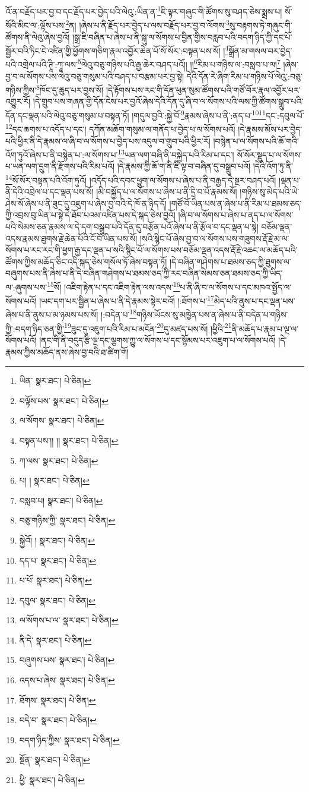 འོ་ན་བརྗོད་པར་བྱ་བ་དང་རྗོད་པར་བྱེད་པའི་ལེའུ་:ཡིན་ན་\footnote{ཡིན་  སྣར་ཐང་།  པེ་ཅིན། }ཇི་ལྟར་གཞུང་གི་ཚོགས་སུ་བཤད་ཅེས་སྨྲས་པ། སོ་སོའི་མིང་ལ་:ལྟོས་པས་\footnote{བལྟོས་པས་  སྣར་ཐང་།  པེ་ཅིན། }ན། །ཞེས་པ་ནི་རྗོད་པར་བྱེད་པ་ལས་བརྗོད་པར་བྱ་བ་ལོགས་\footnote{ལ་སོགས་  སྣར་ཐང་།  པེ་ཅིན། }སུ་བརྟགས་ཏེ་གཞུང་གི་ཚོགས་ནི་ལེའུ་ཞེས་བྱའོ། །སྒྲ་ཇི་བཞིན་པ་ཞེས་པ་ནི་སྐུ་ལ་སོགས་པ་བྱིན་གྱིས་བརླབ་པའི་བདག་ཉིད་ཀྱི་དང་པོ་སྦྱོར་བའི་ཏིང་ངེ་འཛིན་གྱི་ཕྱོགས་གཅིག་རྣལ་འབྱོར་ཆེན་པོ་སོ་སོར་:བསྟན་པས་སོ། །\footnote{བསྟན་པས་།། །།  སྣར་ཐང་།  པེ་ཅིན། }སྒྲོན་མ་གསལ་བར་བྱེད་པའི་འགྲེལ་པའི་ཊཱི་:ཀཱ་ལས་\footnote{ཀ་ལས་  སྣར་ཐང་།  པེ་ཅིན། }ལེའུ་བཅུ་གཉིས་པའི་རྒྱ་ཆེར་བཤད་པའོ།། །།\footnote{པ། །  སྣར་ཐང་།  པེ་ཅིན། }རིམ་པ་གཉིས་ལ་:བསླབ་པ་ལ།\footnote{བསླབ་པ།  སྣར་ཐང་།  པེ་ཅིན། } །ཞེས་བྱ་བ་ལ་སོགས་པས་ལེའུ་བཅུ་གསུམ་པའི་བཤད་པ་བརྩམ་པར་བྱ་སྟེ། དེའི་དོན་རེ་ཞིག་རིམ་པ་གཉིས་པོ་ལེའུ་:བཅུ་གཉིས་ཀྱིས་\footnote{བཅུ་གཉིས་ཀྱི་  སྣར་ཐང་།  པེ་ཅིན། }ཁོང་དུ་ཆུད་པར་བྱས་སོ། །དེ་རྟོགས་པས་རང་གི་དོན་ཕུན་སུམ་ཚོགས་པའི་གཙོ་བོར་རྣལ་འབྱོར་པར་འགྱུར་རོ། །དེ་གྲུབ་པས་གཞན་གྱི་དོན་ངེས་པར་བྱའོ་ཞེས་དེའི་དོན་དུ་ཞི་བ་ལ་སོགས་པའི་ལས་ཀྱི་ཚོགས་སྒྲུབ་པའི་དོན་དང་ལྡན་པའི་ལེའུ་བཅུ་གསུམ་པ་བསྟན་ཏོ། །གདུལ་བྱའི་:སྐྱེ་བོ་\footnote{སྐྱེའོ། །  སྣར་ཐང་།  པེ་ཅིན། }རྣམས་ཞེས་པ་ནི་:ནད་པ་\footnote{དད་པ་  སྣར་ཐང་།  པེ་ཅིན། }\footnote{པ་པོ་  སྣར་ཐང་།  པེ་ཅིན། }དང་:དབུལ་པོ་\footnote{དབུལ་  སྣར་ཐང་།  པེ་ཅིན། }དང་ཆགས་པ་འདོད་པ་དང་། དཀོན་མཆོག་གསུམ་ལ་གནོད་པ་བྱེད་པ་ལ་སོགས་པའོ། །དེ་རྣམས་མོས་པར་བྱེད་པའི་ཕྱིར་ནི་དེ་རྣམས་ལ་ཞི་བ་ལ་སོགས་པ་བྱེད་པས་འདུལ་བ་གྲུབ་པའི་ཕྱིར་རོ། །བསྙེན་པ་ལ་སོགས་པའི་ཆོ་གའི་འོག་ཏུའོ་ཞེས་པ་ནི་བསྙེན་པ་:ལ་སོགས་པ་\footnote{ལ་སོགས་པ་ལ་  སྣར་ཐང་།  པེ་ཅིན། }ཡན་ལག་བཞི་ནི་བསྐྱེད་པའི་རིམ་པ་དང་། སོ་སོར་སྡུད་པ་ལ་སོགས་པ་ཡན་ལག་དྲུག་ནི་རྫོགས་པའི་རིམ་པའོ། །དེ་རྣམས་ཀྱི་ཆོ་ག་ནི་ཇི་ལྟ་བ་བཞིན་དུ་བསྒྲུབ་པའོ། །དེའི་འོག་ཏུ་ནི་\footnote{ནི་དེ་  སྣར་ཐང་།  པེ་ཅིན། }སོ་སོར་བསྟན་པའི་འོག་ཏུའོ། །འདོད་པའི་དབང་ཕྱུག་ལ་སོགས་པ་ཞེས་པ་ནི་བརྒྱད་དེ་སྔར་བཤད་པའོ། །ལྡན་པ་ནི་དེའི་འབྲེལ་པ་དང་ལྡན་པས་སོ། །མི་བསྐྱོད་པ་ལ་སོགས་པ་ཞེས་པ་ནི་དྲི་བ་པོ་རྣམས་སོ། །གཉིས་སུ་མེད་པའི་ཡེ་ཤེས་སོ་ཞེས་པ་ནི་ཟུང་དུ་འཇུག་པ་ཞེས་བྱ་བའི་དེ་ཁོ་ན་ཉིད་དོ། །གཙོ་བོ་ཡིན་པས་ན་ཞེས་པ་ནི་རིམ་པ་ཐམས་ཅད་ཀྱི་འབྲས་བུ་ཡིན་པ་སྟེ་དེ་ཐོབ་པའམ་འཛིན་པས་དེ་སྐད་ཅེས་བྱའོ། །ཞི་བ་ལ་སོགས་པ་ཞེས་པ་ནད་པ་ལ་སོགས་པའི་སེམས་ཅན་རྣམས་ལ་དེ་དག་བསྒྲུབ་པའི་དོན་དུ་བརྩོན་པའོ་ཞེས་པ་ནི་རྩོལ་བ་དང་ལྡན་པ་སྟེ། བཅོམ་ལྡན་འདས་རྣམས་ཐུགས་རྗེ་ཆེན་པོའི་ངོ་བོ་ཡིན་པས་སོ། །སའི་སྙིང་པོ་ཞེས་བྱ་བ་ལ་སོགས་པས་གཟུགས་རྡོ་རྗེ་མ་ལ་སོགས་པ་རང་རང་གི་ཕྱག་རྒྱ་དང་ལྡན་པ་སའི་སྙིང་པོ་ལ་སོགས་པས་བཅོམ་ལྡན་འདས་རྡོ་རྗེ་འཆང་ལ་མཆོད་པའི་ཚོགས་ཀྱིས་མཆོད་ཅིང་འདི་སྐད་ཅེས་གསོལ་ཏོ་ཞེས་བསྟན་ཏོ། །དེ་བཞིན་གཤེགས་པ་ཐམས་ཅད་ཀྱི་ཐུགས་ལ་བཞུགས་པས་ནི་ཞེས་པ་ནི་དེ་བཞིན་གཤེགས་པ་ཐམས་ཅད་ཀྱི་རང་བཞིན་སེམས་ཅན་ཐམས་ཅད་ཀྱི་ཡིད་ལ་:ཞུགས་པས་\footnote{བཞུགས་པས་  སྣར་ཐང་།  པེ་ཅིན། }སོ། །འཇིག་རྟེན་པ་དང་འཇིག་རྟེན་ལས་འདས་\footnote{འདས་པ་ཞེས་  སྣར་ཐང་།  པེ་ཅིན། }པ་ནི་ཞི་བ་ལ་སོགས་པ་དང་མཁའ་སྤྱོད་ལ་སོགས་པའོ། །ཡང་དག་པར་སྦྱིན་པ་ཞེས་པ་ནི་དེ་རྣམས་སྟེར་བའོ། །:ཐོགས་པ་\footnote{ཐོགས་  སྣར་ཐང་།  པེ་ཅིན། }མེད་པའི་ནུས་པ་དང་ལྡན་པས་ཞེས་པ་ནི་ནུས་པ་མ་ཉམས་པས་སོ། །:བདེན་པ་\footnote{བདེ་བ་  སྣར་ཐང་།  པེ་ཅིན། }གཉིས་ཡོངས་སུ་མཁྱེན་པས་ན་ཞེས་པ་ནི་བདེན་པ་གཉིས་ཀྱི་:བདག་ཉིད་ཅན་གྱི་\footnote{བདག་ཉིད་ཀྱིས་  སྣར་ཐང་།  པེ་ཅིན། }ཟུང་དུ་འཇུག་པའི་རིམ་པ་མངོན་\footnote{སྔོན་  སྣར་ཐང་།  པེ་ཅིན། }དུ་མཛད་པས་སོ། །ཕྱིའི་\footnote{ཕྱི་  སྣར་ཐང་།  པེ་ཅིན། }ནི་མཆོད་པ་རྣམ་པ་ལྔ་ལ་སོགས་པའོ། །ནང་གི་ནི་བདུད་རྩི་ལྔ་དང་ལྕགས་ཀྱུ་ལ་སོགས་པ་དང་སྙོམས་པར་འཇུག་པ་ལ་སོགས་པའོ། །དེ་རྣམས་ཀྱིས་མཆོད་ནས་ཞེས་བྱ་བའི་ཐ་ཚིག་གོ། 